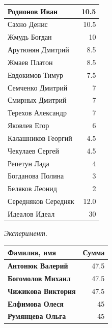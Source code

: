 \documentclass[12pt]{article}
\newlength{\h}
\newlength{\x}
\begin{document}
\begin{table}[ht]
\begin{minipage}[t]{0.48\linewidth}
\begin{tabular}{|l|r|}
      \hline
      Родионов Иван          &   10.5  \\
      \hline
      Сахно Денис            &   10.5  \\
      \hline
      Жмудь Богдан           &     10  \\
      \hline
      Арутюнян Дмитрий       &    8.5  \\
      \hline
      Жмаев Платон           &    8.5  \\
      \hline
      Евдокимов Тимур        &    7.5  \\
      \hline
      Семченко Дмитрий       &      7  \\
      \hline
      Смирных Дмитрий        &     7  \\
      \hline
      Терехов Александр      &     7  \\
      \hline
      Яковлев Егор           &      6  \\
      \hline
      Калашников Георгий     &    4.5  \\
      \hline
      Чекулаев Сергей        &    4.5  \\
      \hline
      Репетун Лада           &      4  \\
      \hline
      Богданова Полина       &      3  \\
      \hline
      Беляков Леонид         &      2  \\
      \hline
      Середняков Середняк    &   12.0  \\
      Идеалов Идеал          &     30  \\
      \hline
    \end{tabular}
  \end{minipage}
  \hfill
  \begin{minipage}[t]{0.48\linewidth}\centering
    \begin{center}
      \textit{Эксперимент.}
    \end{center}
    \begin{tabular}{|l|r|}
      \hline
      Фамилия, имя           &  Сумма  \\
      \hline
      \textbf{Антонюк Валерий}        &   47.5  \\
      \hline
      \textbf{Богомолов Михаил}       &   47.5  \\
      \hline
      \textbf{Чижикова Виктория}      &   47.5  \\
      \hline
      \textbf{Елфимова Олеся}         &    45  \\
      \hline
      \textbf{Румянцева Ольга}        &    45  \\

\end{tabular}
\end{minipage}
\end{table}
\end{document}

